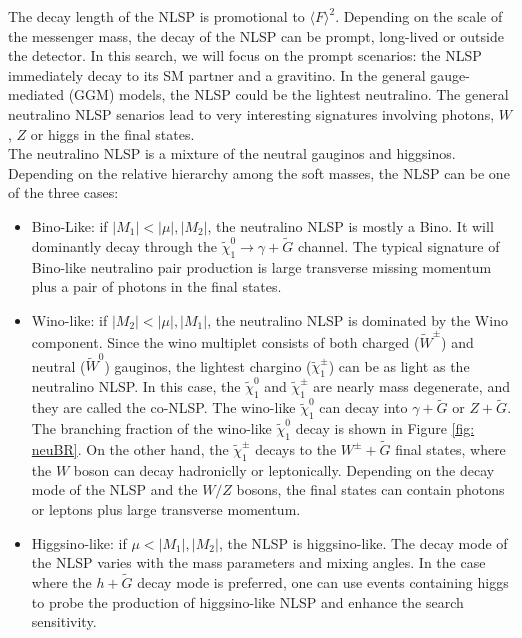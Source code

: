 \documentclass[thesis.tex]{subfiles}
\begin{document}
The decay length of the NLSP is promotional to $\langle F \rangle^2$. 
Depending on the scale of the messenger mass, the decay of the NLSP can be prompt, long-lived or outside the detector. 
In this search, we will focus on the prompt scenarios: the NLSP immediately decay to its SM partner and a gravitino. 
In the general gauge-mediated (GGM) models, the NLSP could be the lightest neutralino. 
The general neutralino NLSP senarios lead to very interesting signatures involving photons, $W$, $Z$ or higgs in the final states. \\

The neutralino NLSP is a mixture of the neutral gauginos and higgsinos. 
Depending on the relative hierarchy among the soft masses, the NLSP can be one of the three cases:
\begin{itemize}
	\item Bino-Like: if $|M_1| < |\mu|,|M_2|$, the neutralino NLSP is mostly a Bino. It will dominantly decay through the $\tilde{\chi}_1^0 \rightarrow \gamma + \tilde{G}$ channel. 
	         The typical signature of Bino-like neutralino pair production is large transverse missing momentum plus a pair of photons in the final states.  
	\item Wino-like: if $|M_2| < |\mu|, |M_1|$, the neutralino NLSP is dominated by the Wino component. 
		Since the wino multiplet consists of both charged ($\tilde{W}^\pm$) and neutral ($\tilde{W}^0$) gauginos, the lightest chargino ($\tilde{\chi}_1^\pm$) can be as light as the neutralino NLSP. 
		In this case, the $\tilde{\chi}_1^0$ and $\tilde{\chi}_1^\pm$ are nearly mass degenerate, and they are called the co-NLSP. 
		The wino-like $\tilde{\chi}_1^0$ can decay into $\gamma + \tilde{G}$ or $Z + \tilde{G}$. 
		The branching fraction of the wino-like $\tilde{\chi}_1^0$ decay is shown in Figure \ref{fig: neuBR}. 
		On the other hand, the $\tilde{\chi}_1^\pm$ decays to the $W^\pm+ \tilde{G}$ final states, where the $W$ boson can decay hadroniclly or leptonically. 
		Depending on the decay mode of the NLSP and the $W/Z$ bosons, the final states can contain photons or leptons plus large transverse momentum. 
	\item Higgsino-like: if $\mu < |M_1|, |M_2|$, the NLSP is higgsino-like. The decay mode of the NLSP varies with the mass parameters and mixing angles. In the case where the $h + \tilde{G}$ decay mode is preferred, one can use events containing higgs to probe the production of higgsino-like NLSP and enhance the search sensitivity. 
\end{itemize}
\end{document}
